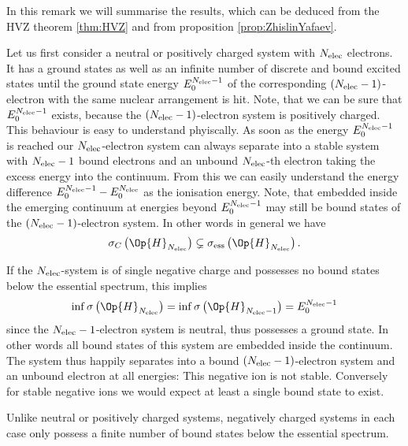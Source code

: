 \begin{rem}
	In this remark we will summarise the results,
	which can be deduced from the HVZ theorem \vref{thm:HVZ}
	and from proposition \vref{prop:ZhislinYafaev}.

	Let us first consider a neutral or positively charged
	system with $N_\text{elec}$ electrons.
	It has a ground states as well as an infinite number
	of discrete and bound excited states
	until the ground state energy $E^{N_\text{elec}-1}_0$
	of the corresponding $(N_\text{elec}-1)$-electron
	with the same nuclear arrangement is hit.
	Note, that we can be sure that $E^{N_\text{elec}-1}_0$
	exists, because the $(N_\text{elec}-1)$-electron system
	is positively charged.
	This behaviour is easy to understand phyiscally.
	As soon as the energy $E^{N_\text{elec}-1}_0$ is reached
	our $N_\text{elec}$-electron system can always
	separate into a stable system with $N_\text{elec}-1$
	bound electrons and an unbound $N_\text{elec}$-th electron
	taking the excess energy into the continuum.
	From this we can easily understand the energy difference
	$E^{N_\text{elec}-1}_0 - E^{N_\text{elec}}_0$
	as the ionisation energy.
	Note, that embedded inside the emerging continuum
	at energies beyond $E^{N_\text{elec}-1}_0$
	may still be bound states of the $(N_\text{elec}-1)$-electron system.
	In other words in general we have
	\[ \sigma_C\left(\Op{H}_{\Nelec}\right)
		\subsetneq \sigma_\text{ess}\left(\Op{H}_{\Nelec}\right). \]

	If the $N_\text{elec}$-system is of single negative charge
	and possesses no bound states below the essential spectrum,
	this implies
	\[ \inf \sigma\left(\Op{H}_{\Nelec}\right)
		= \inf \sigma\left(\Op{H}_{\Nelec-1}\right) = E^{\Nelec-1}_0 \]
	since the $N_\text{elec}-1$-electron system is neutral,
	thus possesses a ground state.
	In other words all bound states of this system
	are embedded inside the continuum.
	The system thus happily separates into a bound $(N_\text{elec}-1)$-electron system
	and an unbound electron at all energies:
	This negative ion is not stable.
	Conversely for stable negative ions
	we would expect at least a single bound state to exist.

	Unlike neutral or positively charged systems,
	negatively charged systems in each case only possess a
	finite number of bound states below
	the essential spectrum.


\end{rem}
